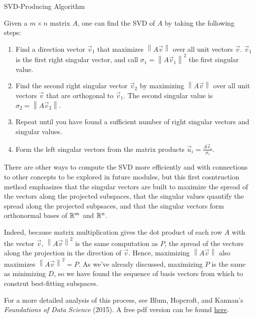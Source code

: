 \documentclass{ximera}
\begin{document}
\begin{theorem}{SVD-Producing Algorithm}

  Given a $m\times n$ matrix $A$, one can find the SVD of $A$ by taking the following steps:

  \begin{enumerate}
    \item Find a direction vector $\vec{v}_1$ that maximizes $\left\|A\vec{v}\right\|$ over all unit vectors $\vec{v}$. $\vec{v}_1$ is the first right singular vector, and call $\sigma_1=\left\|A\vec{v}_1\right\|^2$ the first singular value. 
    \item Find the second right singular vector $\vec{v}_2$ by maximizing $\left\|A\vec{v}\right\|$ over all unit vectors $\vec{v}$ that are orthogonal to $\vec{v}_1$. The second singular value is $\sigma_2=\left\|A\vec{v}_2\right\|$. 
    \item Repeat until you have found a sufficient number of right singular vectors and singular values.
    \item Form the left singular vectors from the matrix products $\vec{u}_i=\frac{A\vec{v}_i}{\sigma_i}$.
  \end{enumerate}

  There are other ways to compute the SVD more efficiently and with connections to other concepts to be explored in future modules, but this first cosntruction method emphasizes that the singular vectors are built to maximize the spread of the vectors along the projected subspaces, that the singular values quantify the spread along the projected subpsaces, and that the singular vectors form orthonormal bases of $\mathbb{R}^m$ and $\mathbb{R}^n$. 

  Indeed, because matrix multiplication gives the dot product of each row $A$ with the vector $\vec{v}$, $\left\|A\vec{v}\right\|^2$ is the same computation as $P$, the spread of the vectors along the projection in the direction of $\vec{v}$. Hence, maximizing $\left\|A\vec{v}\right\|$ also maximizes $\left\|A\vec{v}\right\|^2=P$. As we've already discussed, maximizing $P$ is the same as minimizing $D$, so we have found the sequence of basis vectors from which to construt best-fitting subspaces.

  For a more detailed analysis of this process, see Blum, Hopcroft, and Kannan's \emph{Foundations of Data Science} (2015). A free pdf version can be found \href{https://www.cs.cornell.edu/jeh/book.pdf}{here}.

\end{theorem}
\end{document}
